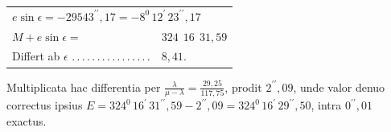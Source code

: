 \begin{center}
\begin{tabular}{@{}ll@{}}
\multicolumn{2}{l}{$e\sin\epsilon=-29543^{\prime\prime}{,}17=-8^0\,12^{\prime}\,23^{\prime\prime}{,}17$}\\[.3em]
$M+e\sin\epsilon=$ & $324\ \ 16\ \ 31{,}59$\\[.3em]
Differt ab $\epsilon$ .\,.\,.\,.\,.\,.\,.\,.\,.\,.\,.\,.\,.\,.\,.\,. & $8{,}41$.
\end{tabular}
\end{center}
\noindent Multiplicata hac differentia per $\frac{\lambda}{\mu-\lambda}=\frac{29{,}25}{117{,}75}$, prodit $2^{\prime\prime}{,}09$, unde valor denuo correctus ipsius $E=324^0\,16^{\prime}\,31^{\prime\prime}{,}59-2^{\prime\prime}{,}09=324^0\,16^{\prime}\,29^{\prime\prime}{,}50$, intra $0^{\prime\prime}{,}01$ exactus.
